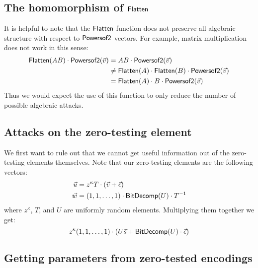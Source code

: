 \subsection{The homomorphism of $\mathsf{Flatten}$}

It is helpful to note that the $\mathsf{Flatten}$ function does not preserve all algebraic structure with respect to $\mathsf{Powersof2}$ vectors.  For example, matrix multiplication does not work in this sense:
\begin{align*}
\mathsf{Flatten}(AB)\cdot \mathsf{Powersof2}(\vec{v}) &= AB \cdot \mathsf{Powersof2}(\vec{v})\\
&\not= \mathsf{Flatten}(A)\cdot \mathsf{Flatten}(B)\cdot \mathsf{Powersof2}(\vec{v})\\ 
&= \mathsf{Flatten}(A)\cdot B\cdot \mathsf{Powersof2}(\vec{v})
\end{align*}
Thus we would expect the use of this function to only reduce the number of possible algebraic attacks.

\subsection{Attacks on the zero-testing element}

We first want to rule out that we cannot get useful information out of the zero-testing elements themselves.  Note that our zero-testing elements are the following vectors:
\begin{align*}
\vec{u} &= z^\kappa T\cdot (\vec{v} + \vec{\epsilon})\\
\vec{w} &= (1,1,\ldots, 1)\cdot\mathsf{BitDecomp}(U)\cdot T^{-1}
\end{align*}
where $z^\kappa$, $T$, and $U$ are uniformly random elements.  Multiplying them together we get:
$$z^\kappa (1,1,\ldots, 1)\cdot (U\vec{s} + \mathsf{BitDecomp}(U)\cdot\vec{\epsilon})$$

\subsection{Getting parameters from zero-tested encodings}

